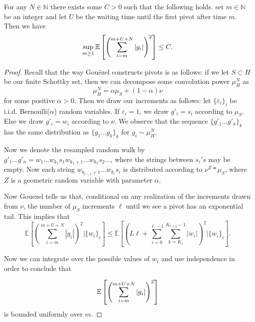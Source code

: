 \begin{lem}\label{lem: small values mn} For any $ N \in \mathbb{N} $ there exists some $ C > 0$ such that the following holds. set $ m \in \mathbb{N} $ be an integer and let $ U $ be the waiting time until the first pivot after time $ m $. Then we have
	$$\sup_{m\ge 1}\mathbb{E}\left[\left( \sum_{i=m}^{m+U+N}|g_i| \right)^2\right]\le C.$$
\end{lem}
\begin{proof}
%	
	Recall that the way Gouëzel constructs pivots is as follows: if we let $ S \subset H$ be our finite Schottky set, then we can decompose some convolution power $ \mu _{H} ^{N} $ as \[ \mu _{H} ^{N} = \alpha \mu _{S} + (1-\alpha)\nu \] for some positive $ \alpha >0$. Then we draw our increments as follows: let $ \{ \varepsilon _{i} \} _{i} $ be i.i.d. Bernoulli($ \alpha $) random variables. If $ \varepsilon _{i} = 1 $, we draw $ g' _{i} = s _{i} $ according to $ \mu _{S} $. Else we draw $g' _{i} = w _{i} $ according to $ \nu $. We observe that the sequence $ \{ g '_{1}...g' _{k} \} _{k} $ has the same distribution as $ \{ g _{1}...g _{k} \} _{k} $ for $ g _{i} \sim \mu _{H} ^{N} $.
	
	Now we denote the resampled random walk by $ g' _{1}...g' _{n} =w _{1}...w _{k _{1}} s _{1} w _{k _{1} +1} ...w _{k _{2}} s _{2} ... $, where the strings between $ s _{i}'s $ may be empty. Now each string $ w _{k _{i-1} +1}...w _{k _{i}} s _{i}  $ is distributed according to $ \nu ^{Z}* \mu _{S} $, where $ Z $ is a geometric random variable with parameter $ \alpha $. 
	
	Now Gouezel tells us that, conditional on any realization of the increments drawn from $ \nu $, the number of $ \mu _{S} $ increments $ \ell $ until we see a pivot has an exponential tail. This implies that
	\[ \mathbb{E} \left[\left(\sum_{i = m}^{m+U+N} |g _{i}| \right) ^{2} | \{ w _{i} \}_i \right] \leq \mathbb{E} \left[\left(L\ell + \sum_{i = 0}^{\ell-1} \sum_{k = K _{i}}^{K _{i+1} -1} |w _{i}|\right) ^{2} | \{ w _{i} \} _{i} \right] .\] 
	
	Now we can integrate over the possible values of $ w _{i} $ and use independence in order to conclude that 
	
	\[ \mathbb{E}\left[\left( \sum_{i=m}^{m+U+N}|g_i| \right)^2\right] \] is bounded uniformly over $ m $.
\end{proof}

